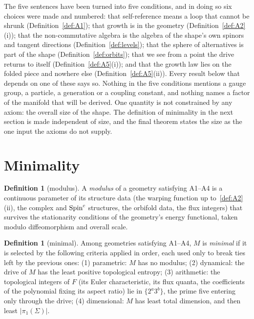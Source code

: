 \documentclass[11pt,a4paper]{article}
\theoremstyle{plain}
\theoremstyle{definition}
\newtheorem{definition}[theorem]{Definition}
\theoremstyle{remark}
\begin{document}
The five sentences have been turned into five conditions, and in doing so six choices were made and numbered: that self-reference means a loop that cannot be shrunk (Definition~\ref{def:A1}); that growth is in the geometry (Definition~\ref{def:A2}(i)); that the non-commutative algebra is the algebra of the shape's own spinors and tangent directions (Definition~\ref{def:levels}); that the sphere of alternatives is part of the shape (Definition~\ref{def:orbits}); that we see from a point the drive returns to itself (Definition~\ref{def:A5}(i)); and that the growth law lies on the folded piece and nowhere else (Definition~\ref{def:A5}(ii)). Every result below that depends on one of these says so. Nothing in the five conditions mentions a gauge group, a particle, a generation or a coupling constant, and nothing names a factor of the manifold that will be derived. One quantity is not constrained by any axiom: the overall size of the shape. The definition of minimality in the next section is made independent of size, and the final theorem states the size as the one input the axioms do not supply.

\section{Minimality}\label{sec:minimal}

\begin{definition}[modulus]\label{def:modulus}
A \emph{modulus} of a geometry satisfying A1--A4 is a continuous parameter of its structure data (the warping function up to~\eqref{def:A2}(ii), the complex and $\text{Spin}^c$ structures, the orbifold data, the flux integers) that survives the stationarity conditions of the geometry's energy functional, taken modulo diffeomorphism and overall scale.
\end{definition}

\begin{definition}[minimal]\label{def:minimal}
Among geometries satisfying A1--A4, $M$ is \emph{minimal} if it is selected by the following criteria applied in order, each used only to break ties left by the previous ones: (1) parametric: $M$ has no modulus; (2) dynamical: the drive of $M$ has the least positive topological entropy; (3) arithmetic: the topological integers of $F$ (its Euler characteristic, its flux quanta, the coefficients of the polynomial fixing its aspect ratio) lie in $\{2^{a}3^{b}\}$, the prime five entering only through the drive; (4) dimensional: $M$ has least total dimension, and then least $\lvert\pi_{1}(\Sigma)\rvert$.
\end{definition}
\end{document}
